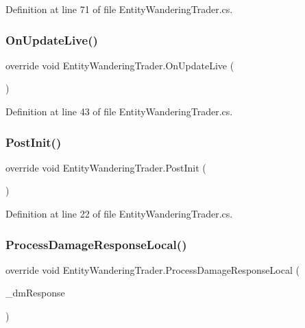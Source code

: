 Definition at line 71 of file Entity\+Wandering\+Trader.\+cs.

\mbox{\label{class_entity_wandering_trader_a7da11dfb0d8ca77baac19b566b157134}} 
\subsubsection{\texorpdfstring{OnUpdateLive()}{OnUpdateLive()}}
{\footnotesize\ttfamily override void Entity\+Wandering\+Trader.\+On\+Update\+Live (\begin{DoxyParamCaption}{ }\end{DoxyParamCaption})}



Definition at line 43 of file Entity\+Wandering\+Trader.\+cs.

\mbox{\label{class_entity_wandering_trader_abd28fa0f0a2ef37396d0c9669c659da2}} 
\subsubsection{\texorpdfstring{PostInit()}{PostInit()}}
{\footnotesize\ttfamily override void Entity\+Wandering\+Trader.\+Post\+Init (\begin{DoxyParamCaption}{ }\end{DoxyParamCaption})}



Definition at line 22 of file Entity\+Wandering\+Trader.\+cs.

\mbox{\label{class_entity_wandering_trader_a25f75b07bb3da64df34855c23225015d}} 
\subsubsection{\texorpdfstring{ProcessDamageResponseLocal()}{ProcessDamageResponseLocal()}}
{\footnotesize\ttfamily override void Entity\+Wandering\+Trader.\+Process\+Damage\+Response\+Local (\begin{DoxyParamCaption}\item[{Damage\+Response}]{\+\_\+dm\+Response }\end{DoxyParamCaption})}



